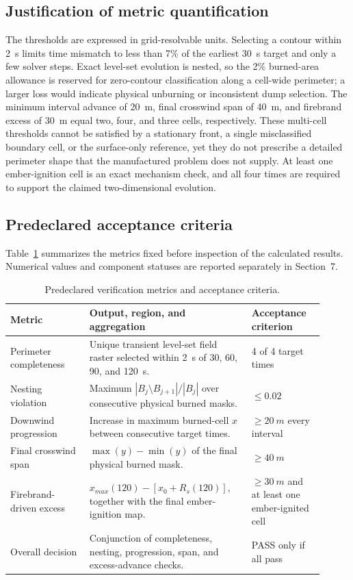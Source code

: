\subsection{Justification of metric quantification}

The thresholds are expressed in grid-resolvable units.  Selecting a contour
within \SI{2}{s} limits time mismatch to less than 7\% of the earliest
\SI{30}{s} target and only a few solver steps.  Exact level-set evolution is
nested, so the 2\% burned-area allowance is reserved for zero-contour
classification along a cell-wide perimeter; a larger loss would indicate
physical unburning or inconsistent dump selection.  The minimum interval
advance of \SI{20}{m}, final crosswind span of \SI{40}{m}, and firebrand
excess of \SI{30}{m} equal two, four, and three cells, respectively.  These
multi-cell thresholds cannot be satisfied by a stationary front, a single
misclassified boundary cell, or the surface-only reference, yet they do not
prescribe a detailed perimeter shape that the manufactured problem does not
supply.  At least one ember-ignition cell is an exact mechanism check, and all
four times are required to support the claimed two-dimensional evolution.

\subsection{Predeclared acceptance criteria}

Table~\ref{tab:acceptance-contract} summarizes the metrics fixed before
inspection of the calculated results. Numerical values and component statuses
are reported separately in Section~7.

\begin{table}[H]
\centering
\footnotesize
\caption{Predeclared verification metrics and acceptance criteria.}
\label{tab:acceptance-contract}
\begin{tabular}{@{}p{0.23\linewidth}p{0.47\linewidth}p{0.21\linewidth}@{}}
\toprule
Metric & Output, region, and aggregation & Acceptance criterion\\
\midrule
Perimeter completeness & Unique transient level-set field raster selected within \SI{2}{s} of 30, 60, 90, and \SI{120}{s}. & 4 of 4 target times \\
Nesting violation & Maximum \(|B_j\setminus B_{j+1}|/|B_j|\) over consecutive physical burned masks. & \(\le0.02\) \\
Downwind progression & Increase in maximum burned-cell \(x\) between consecutive target times. & \(\ge\SI{20}{m}\) every interval \\
Final crosswind span & \(\max(y)-\min(y)\) of the final physical burned mask. & \(\ge\SI{40}{m}\) \\
Firebrand-driven excess & \(x_{max}(120)-[x_0+R_s(120)]\), together with the final ember-ignition map. & \(\ge\SI{30}{m}\) and at least one ember-ignited cell \\
Overall decision & Conjunction of completeness, nesting, progression, span, and excess-advance checks. & PASS only if all pass \\
\bottomrule
\end{tabular}
\end{table}

